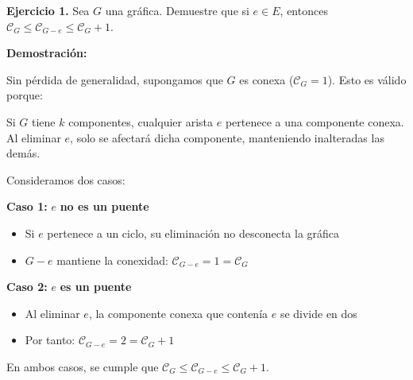 \textbf{Ejercicio 1.} Sea $G$ una gráfica. Demuestre que si $e \in E$, entonces 
$\mathcal{C}_G \le \mathcal{C}_{G-e} \le \mathcal{C}_G + 1$.

\textbf{Demostración:}

Sin pérdida de generalidad, supongamos que $G$ es conexa ($\mathcal{C}_G = 1$). Esto es válido porque:

Si $G$ tiene $k$ componentes, cualquier arista $e$ pertenece a una componente conexa. Al eliminar $e$, 
solo se afectará dicha componente, manteniendo inalteradas las demás.

Consideramos dos casos:

\textbf{Caso 1:} $e$ \textbf{no es un puente}
\begin{itemize}
    \item Si $e$ pertenece a un ciclo, su eliminación no desconecta la gráfica
    \item $G - e$ mantiene la conexidad: $\mathcal{C}_{G - e} = 1 = \mathcal{C}_G$
\end{itemize}

\textbf{Caso 2:} $e$ \textbf{es un puente}
\begin{itemize}
    \item Al eliminar $e$, la componente conexa que contenía $e$ se divide en dos
    \item Por tanto: $\mathcal{C}_{G - e} = 2 = \mathcal{C}_G + 1$
\end{itemize}

En ambos casos, se cumple que $\mathcal{C}_G \le \mathcal{C}_{G-e} \le \mathcal{C}_G + 1$.

\QED

\newpage